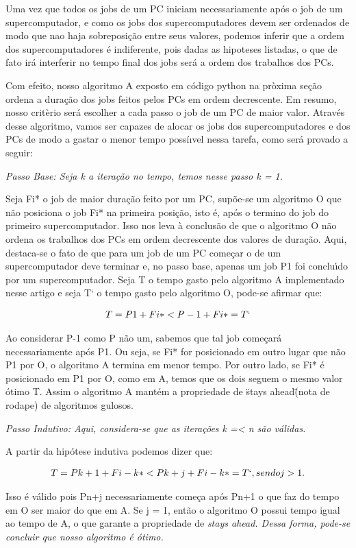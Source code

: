 \documentclass{article}
\begin{document}
    Uma vez que todos os jobs de um PC iniciam necessariamente ap\'os o job de um supercomputador, e como os
    jobs dos supercomputadores devem ser ordenados de modo que nao haja sobreposi\c{c}\~ao entre seus valores,
    podemos inferir que a ordem dos supercomputadores \'e indiferente, pois dadas as hipoteses listadas, o
    que de fato ir\'a interferir no tempo final dos jobs ser\'a a ordem dos trabalhos dos PCs.

    Com efeito, nosso algoritmo A exposto em c\'odigo python na pr\`oxima se\c{c}\~ao ordena a dura\c{c}\~ao
    dos jobs feitos pelos PCs em ordem decrescente. Em resumo, nosso crit\`erio ser\'a escolher a cada passo
    o job de um PC de maior valor. Atrav\'es desse algoritmo, vamos ser capazes de alocar os jobs dos supercomputadores
    e dos PCs de modo a gastar o menor tempo poss\'i{\i}vel nessa tarefa, como ser\'a provado a seguir:

\it Passo Base: Seja k a itera\c{c}\~ao no tempo, temos nesse passo k = 1.

Seja Fi* o job de maior dura\c{c}\~ao feito por um PC, sup\~oe-se um algoritmo O que n\~ao posiciona o job Fi*
na primeira posi\c{c}\~ao, isto \'e, ap\'os o termino do job do primeiro supercomputador. Isso nos leva \`a
conclus\~ao de que o algoritmo O n\~ao ordena os trabalhos dos PCs em ordem decrescente dos valores de
dura\c{c}\~ao. Aqui, destaca-se o fato de que para um job de um PC come\c{c}ar o de um supercomputador deve
terminar e, no passo base, apenas um job P1 foi conclu\'{\i}do por um supercomputador. Seja T o tempo gasto
pelo algoritmo A implementado nesse artigo e seja T` o tempo gasto pelo algoritmo O, pode-se afirmar que:

\begin{equation}\label{Inducao}
  \begin{split}
    T = P1 + Fi* < P-1 + Fi* = T`
      \end{split}
\end{equation}

Ao considerar P-1 como P n\~ao um, sabemos que tal job come\c{c}ar\'a necessariamente
ap\'os P1. Ou seja, se Fi* for posicionado em outro lugar que n\~ao P1 por O, o algoritmo A termina em menor tempo. Por
outro lado, se Fi* \'e posicionado em P1 por O, como em A, temos que os dois seguem o mesmo valor \'otimo T. Assim
o algoritmo A mant\'em a propriedade de \"stays ahead\"(nota de rodape) de algoritmos gulosos.

\it Passo Indutivo: Aqui, considera-se que as itera\c{c}\~oes k =< n s\~ao v\'alidas.

A partir da hip\'otese indutiva podemos dizer que:

\begin{equation}\label{Inducao}
  \begin{split}
    T = Pk+1 + Fi-k* < Pk+j + Fi-k* = T` , sendo j > 1.
      \end{split}
\end{equation}

Isso \'e v\'alido pois Pn+j necessariamente come\c{c}a ap\'os Pn+1 o que faz do tempo em O ser maior do que em A. Se j = 1,
ent\~ao o algoritmo O possui tempo igual ao tempo de A, o que garante a propriedade de \it{stays ahead}.
Dessa forma, pode-se concluir que nosso algoritmo \'e \'otimo.
\end{document}
